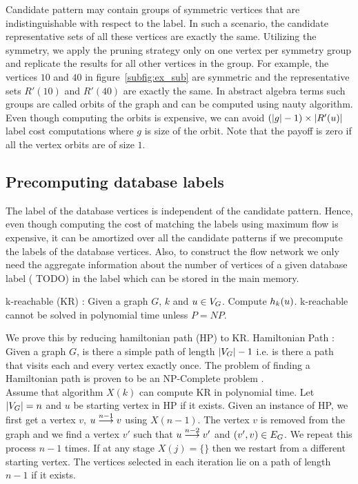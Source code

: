  Candidate pattern may contain groups of symmetric
vertices that are indistinguishable with respect to the \khop label. In such a scenario, 
the candidate representative sets of all these vertices are exactly the same. Utilizing the
symmetry, we apply the pruning strategy only on one vertex per symmetry group and 
replicate the results for all other vertices in the group. For example, the
vertices $10$ and $40$ in figure~\ref{subfig:ex_sub} are symmetric and
the representative sets $R'(10)$ and $R'(40)$ are exactly the same.
In abstract algebra terms such  
groups are called orbits of the graph and can be computed using nauty algorithm. Even though
computing the orbits is expensive, we can avoid $ (|g|-1) \times |\CR|$ \khop label cost computations
where $g$ is size of the orbit. Note that the payoff is zero if all the vertex orbits are of
size $1$.

\subsection{Precomputing database \khop labels}
The \khop label of the database vertices is independent of the candidate pattern. Hence, even though
computing the cost of matching the \khop labels using maximum flow is expensive, it
can be amortized over all the candidate patterns  if we precompute the \khop labels of the
database vertices. Also, to construct the flow network we only need the aggregate information
about the number of vertices of a given database label ( TODO) 
in the \khop label which can be stored in the main memory. 

\begin{thm}
k-reachable (KR) : Given a graph $G$, $k$ and $u \in \vg$. Compute $\khopl{k}{u}$.
k-reachable cannot be solved in polynomial time unless $P = NP$.

\begin{myproof}
We prove this by reducing hamiltonian path (HP) to KR.
Hamiltonian Path : Given a graph $G$, is there a simple path of length
$|\vg|-1$ i.e. is there a path that visits each and every vertex exactly
once. The problem of finding a Hamiltonian path is proven to be an NP-Complete
problem \cite{npcomplete}.\\
Assume that algorithm $X(k)$ can compute KR in polynomial time. Let $|\vg| = n$ 
and $u$ be starting vertex in HP if it exists.
Given an instance of HP, we first get a vertex $v$, $\kpath{u}{v}{n-1}$ using
$X(n-1)$. The vertex $v$ is removed from the graph and we find a vertex $v'$
such that $\kpath{u}{v'}{n-2}$ and $(v', v) \in \eg$. We repeat this process
$n-1$ times. If at any stage $X(j) = \{\}$ then we restart from a different starting
vertex. The vertices selected in each iteration lie on a path of length $n-1$ if it exists.
\end{myproof}
\end{thm}

